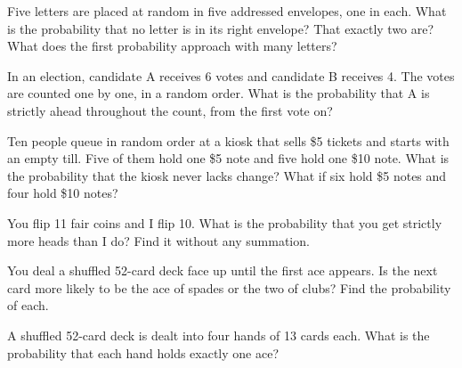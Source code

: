 \begin{question}\label{iq:iv1:counting-and-symmetry:12}
Five letters are placed at random in five addressed envelopes, one in each. What is the probability that no letter is in its right envelope? That exactly two are? What does the first probability approach with many letters?
\end{question}

\begin{question}\label{iq:iv1:counting-and-symmetry:13}
In an election, candidate A receives 6 votes and candidate B receives 4. The votes are counted one by one, in a random order. What is the probability that A is strictly ahead throughout the count, from the first vote on?
\end{question}

\begin{question}\label{iq:iv1:counting-and-symmetry:14}
Ten people queue in random order at a kiosk that sells \$5 tickets and starts with an empty till. Five of them hold one \$5 note and five hold one \$10 note. What is the probability that the kiosk never lacks change? What if six hold \$5 notes and four hold \$10 notes?
\end{question}

\begin{question}\label{iq:iv1:counting-and-symmetry:15}
You flip 11 fair coins and I flip 10. What is the probability that you get strictly more heads than I do? Find it without any summation.
\end{question}

\begin{question}\label{iq:iv1:counting-and-symmetry:16}
You deal a shuffled 52-card deck face up until the first ace appears. Is the next card more likely to be the ace of spades or the two of clubs? Find the probability of each.
\end{question}

\begin{question}\label{iq:iv1:counting-and-symmetry:17}
A shuffled 52-card deck is dealt into four hands of 13 cards each. What is the probability that each hand holds exactly one ace?
\end{question}


